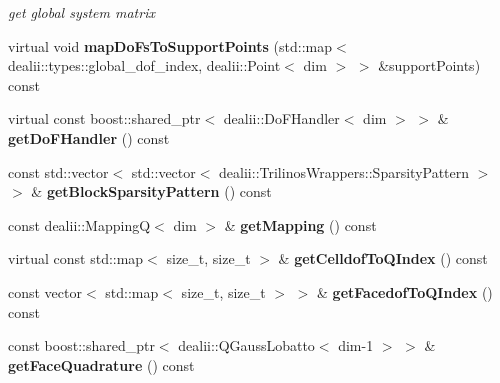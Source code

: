 \begin{DoxyCompactItemize}
\begin{DoxyCompactList}\small\item\em get global system matrix \item\end{DoxyCompactList}\item 
\hypertarget{classnatrium_1_1SemiLagrangian_a91283ee7b7dfd1ecaa92992b9b48ee5d}{
virtual void {\bfseries mapDoFsToSupportPoints} (std::map$<$ dealii::types::global\_\-dof\_\-index, dealii::Point$<$ dim $>$ $>$ \&supportPoints) const }
\label{classnatrium_1_1SemiLagrangian_a91283ee7b7dfd1ecaa92992b9b48ee5d}

\item 
\hypertarget{classnatrium_1_1SemiLagrangian_a5e3e4c9820cf2701f789f8ba8ea9d9ac}{
virtual const boost::shared\_\-ptr$<$ dealii::DoFHandler$<$ dim $>$ $>$ \& {\bfseries getDoFHandler} () const }
\label{classnatrium_1_1SemiLagrangian_a5e3e4c9820cf2701f789f8ba8ea9d9ac}

\item 
\hypertarget{classnatrium_1_1SemiLagrangian_a6cdea22c2d1999275488710ab08c94fa}{
const std::vector$<$ std::vector$<$ dealii::TrilinosWrappers::SparsityPattern $>$ $>$ \& {\bfseries getBlockSparsityPattern} () const }
\label{classnatrium_1_1SemiLagrangian_a6cdea22c2d1999275488710ab08c94fa}

\item 
\hypertarget{classnatrium_1_1SemiLagrangian_ac7bcf29bf27ec29138625b753fd5ea57}{
const dealii::MappingQ$<$ dim $>$ \& {\bfseries getMapping} () const }
\label{classnatrium_1_1SemiLagrangian_ac7bcf29bf27ec29138625b753fd5ea57}

\item 
\hypertarget{classnatrium_1_1SemiLagrangian_a7fada93fe551913cbd3953b649bac5ab}{
virtual const std::map$<$ size\_\-t, size\_\-t $>$ \& {\bfseries getCelldofToQIndex} () const }
\label{classnatrium_1_1SemiLagrangian_a7fada93fe551913cbd3953b649bac5ab}

\item 
\hypertarget{classnatrium_1_1SemiLagrangian_a76b652f977cd083a430c664ae28b9d1d}{
const vector$<$ std::map$<$ size\_\-t, size\_\-t $>$ $>$ \& {\bfseries getFacedofToQIndex} () const }
\label{classnatrium_1_1SemiLagrangian_a76b652f977cd083a430c664ae28b9d1d}

\item 
\hypertarget{classnatrium_1_1SemiLagrangian_a85f0c5658089dad43594df005398b478}{
const boost::shared\_\-ptr$<$ dealii::QGaussLobatto$<$ dim-\/1 $>$ $>$ \& {\bfseries getFaceQuadrature} () const }
\label{classnatrium_1_1SemiLagrangian_a85f0c5658089dad43594df005398b478}


\end{DoxyCompactItemize}
